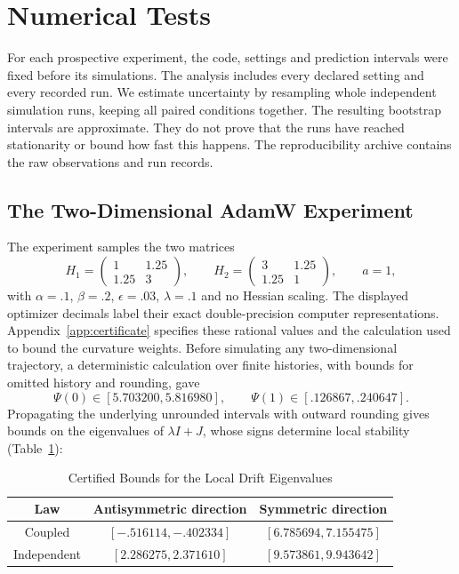 \section{Numerical Tests}
For each prospective experiment, the code, settings and prediction intervals
were fixed before its simulations. The analysis includes every declared
setting and every recorded run. We estimate uncertainty by resampling whole
independent simulation runs, keeping all paired conditions together.
The resulting bootstrap intervals are approximate. They do not prove that
the runs have reached stationarity or bound how fast this happens.
The reproducibility archive contains the raw observations and run records.

\subsection{The Two-Dimensional AdamW Experiment}\label{sec:matrix-experiment}
The experiment samples the two matrices
\[
 H_1=\begin{pmatrix}1&1.25\\1.25&3\end{pmatrix},\qquad
 H_2=\begin{pmatrix}3&1.25\\1.25&1\end{pmatrix},\qquad a=1,
\]
with $\alpha=.1$, $\beta=.2$, $\epsilon=.03$, $\lambda=.1$ and no
Hessian scaling. The displayed optimizer decimals label their exact
double-precision computer representations. Appendix~\ref{app:certificate}
specifies these rational values and the calculation used to bound the
curvature weights. Before simulating any two-dimensional trajectory, a
deterministic calculation over finite histories, with bounds for omitted
history and rounding, gave
\[
 \Psi(0)\in[5.703200,5.816980],\qquad
 \Psi(1)\in[.126867,.240647].
\]
Propagating the underlying unrounded intervals with outward rounding gives bounds on the
eigenvalues of $\lambda I+J$, whose signs determine local stability
(Table~\ref{tab:field-stability}):
\begin{table}[htbp]
\caption{Certified Bounds for the Local Drift Eigenvalues}\label{tab:field-stability}
\centering

\begin{tabular}{ccc}
\toprule
Law & Antisymmetric direction & Symmetric direction\\
\midrule
Coupled & $[-.516114,-.402334]$ & $[6.785694,7.155475]$\\
Independent & $[2.286275,2.371610]$ & $[9.573861,9.943642]$\\
\bottomrule
\end{tabular}
\end{table}

